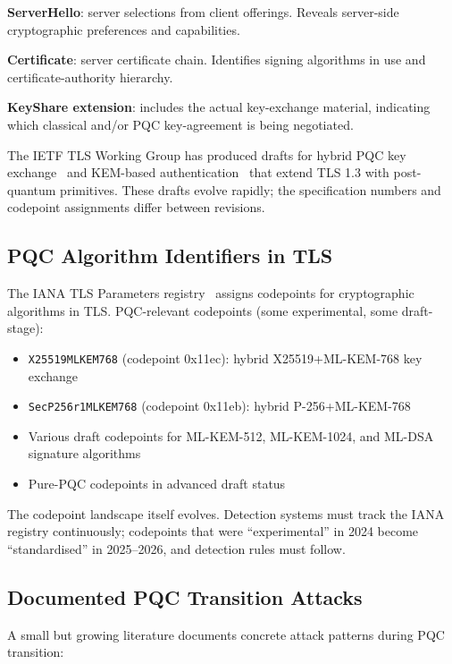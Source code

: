 \documentclass[sigconf,nonacm]{acmart}
\begin{document}
\textbf{ServerHello}: server selections from client offerings.
Reveals server-side cryptographic preferences and capabilities.

\textbf{Certificate}: server certificate chain. Identifies signing
algorithms in use and certificate-authority hierarchy.

\textbf{KeyShare extension}: includes the actual key-exchange
material, indicating which classical and/or PQC key-agreement is
being negotiated.

The IETF TLS Working Group has produced drafts for hybrid PQC
key exchange~\cite{stebila2024hybridkex} and KEM-based
authentication~\cite{westerbaan2024kem} that extend TLS 1.3 with
post-quantum primitives. These drafts evolve rapidly; the
specification numbers and codepoint assignments differ between
revisions.

\subsection{PQC Algorithm Identifiers in TLS}

The IANA TLS Parameters registry~\cite{iana2024tls} assigns
codepoints for cryptographic algorithms in TLS. PQC-relevant
codepoints (some experimental, some draft-stage):

\begin{itemize}
  \item \texttt{X25519MLKEM768} (codepoint 0x11ec): hybrid
        X25519+ML-KEM-768 key exchange
  \item \texttt{SecP256r1MLKEM768} (codepoint 0x11eb): hybrid
        P-256+ML-KEM-768
  \item Various draft codepoints for ML-KEM-512, ML-KEM-1024,
        and ML-DSA signature algorithms
  \item Pure-PQC codepoints in advanced draft status
\end{itemize}

The codepoint landscape itself evolves. Detection systems must
track the IANA registry continuously; codepoints that were
``experimental'' in 2024 become ``standardised'' in 2025--2026,
and detection rules must follow.

\subsection{Documented PQC Transition Attacks}

A small but growing literature documents concrete attack patterns
during PQC transition:
\end{document}
